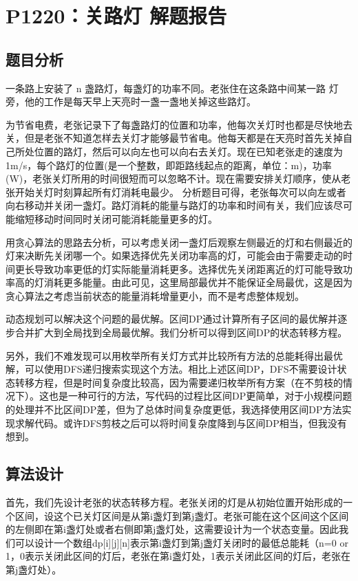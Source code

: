 \documentclass[supercite]{Experimental_Report}
\theoremstyle{definition}
\begin{document}
\section{P1220：关路灯 解题报告}

\subsection{题目分析}
一条路上安装了 n 盏路灯，每盏灯的功率不同。老张住在这条路中间某一路 灯旁，他的工作是每天早上天亮时一盏一盏地关掉这些路灯。 

为节省电费，老张记录下了每盏路灯的位置和功率，他每次关灯时也都是尽快地去关，但是老张不知道怎样去关灯才能够最节省电。他每天都是在天亮时首先关掉自己所处位置的路灯，然后可以向左也可以向右去关灯。现在已知老张走的速度为 1m/s，每个路灯的位置(是一个整数，即距路线起点的距离，单位：m)，功率(W)，老张关灯所用的时间很短而可以忽略不计。现在需要安排关灯顺序，使从老张开始关灯时刻算起所有灯消耗电最少。
分析题目可得，老张每次可以向左或者向右移动并关闭一盏灯。路灯消耗的能量与路灯的功率和时间有关，我们应该尽可能缩短移动时间同时关闭可能消耗能量更多的灯。

用贪心算法的思路去分析，可以考虑关闭一盏灯后观察左侧最近的灯和右侧最近的灯来决断先关闭哪一个。如果选择优先关闭功率高的灯，可能会由于需要走动的时间更长导致功率更低的灯实际能量消耗更多。选择优先关闭距离近的灯可能导致功率高的灯消耗更多能量。由此可见，这里局部最优并不能保证全局最优，这是因为贪心算法之考虑当前状态的能量消耗增量更小，而不是考虑整体规划。

动态规划可以解决这个问题的最优解。区间DP通过计算所有子区间的最优解并逐步合并扩大到全局找到全局最优解。我们分析可以得到区间DP的状态转移方程。

另外，我们不难发现可以用枚举所有关灯方式并比较所有方法的总能耗得出最优解，可以使用DFS递归搜索实现这个方法。相比上述区间DP，DFS不需要设计状态转移方程，但是时间复杂度比较高，因为需要递归枚举所有方案（在不剪枝的情况下）。这也是一种可行的方法，写代码的过程比区间DP更简单，对于小规模问题的处理并不比区间DP差，但为了总体时间复杂度更低，我选择使用区间DP方法实现求解代码。或许DFS剪枝之后可以将时间复杂度降到与区间DP相当，但我没有想到。

\subsection{算法设计}
首先，我们先设计老张的状态转移方程。老张关闭的灯是从初始位置开始形成的一个区间，设这个已关灯区间是从第i盏灯到第j盏灯。老张可能在这个区间这个区间的左侧即在第i盏灯处或者右侧即第j盏灯处，这需要设计为一个状态变量。因此我们可以设计一个数组dp[i][j][n]表示第i盏灯到第j盏灯关闭时的最低总能耗（n=0 or 1，0表示关闭此区间的灯后，老张在第i盏灯处，1表示关闭此区间的灯后，老张在第j盏灯处）。
\end{document}
